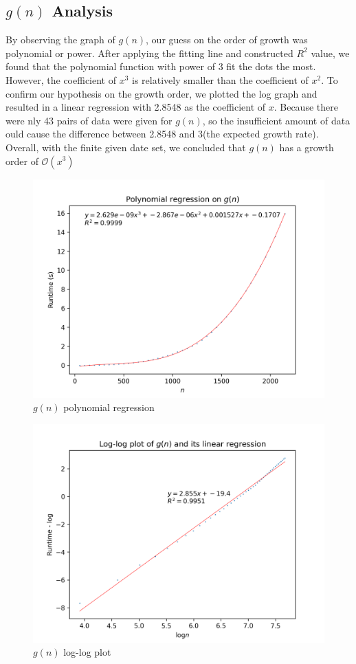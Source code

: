 \documentclass[titlepage, 12pt]{article}
\begin{document}
\subsection{$g(n)$ Analysis}
By observing the graph of $g(n)$, our guess on the order of growth was
polynomial or power. After applying the fitting line and constructed $R^{2}$
value, we found that the polynomial function with power of 3 fit the dots the
most. However, the coefficient of $x^{3}$ is relatively smaller than the
coefficient of $x^{2}$. To confirm our hypothesis on the growth order, we
plotted the log graph and resulted in a linear regression with 2.8548 as the
coefficient of $x$. Because there were nly 43 pairs of data were given for
$g(n)$, so the insufficient amount of data ould cause the difference between
2.8548 and 3(the expected growth rate). Overall, with the finite given date set,
we concluded that $g(n)$ has a growth order of $\mathcal{O}(x^{3})$
\begin{figure}[H]
    \includegraphics[width=0.8\linewidth]{gn-polyreg.png}
    \centering
    \caption{$g(n)$ polynomial regression}
    \label{fig:gn-polyreg}
\end{figure}
\begin{figure}[H]
    \includegraphics[width=0.8\linewidth]{gn-log-linreg.png}
    \centering
    \caption{$g(n)$ log-log plot}
    \label{fig:gn-log-linreg}
\end{figure}
\end{document}
